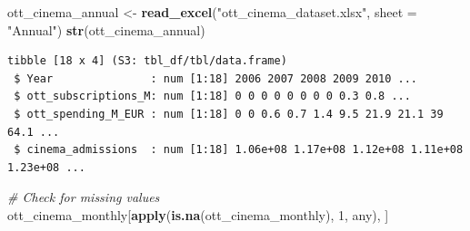 \documentclass[
]{article}
\newenvironment{Shaded}{\begin{snugshade}}{\end{snugshade}}
\newcommand{\AttributeTok}[1]{\textcolor[rgb]{0.13,0.29,0.53}{#1}}
\newcommand{\CommentTok}[1]{\textcolor[rgb]{0.56,0.35,0.01}{\textit{#1}}}
\newcommand{\DecValTok}[1]{\textcolor[rgb]{0.00,0.00,0.81}{#1}}
\newcommand{\FunctionTok}[1]{\textcolor[rgb]{0.13,0.29,0.53}{\textbf{#1}}}
\newcommand{\NormalTok}[1]{#1}
\newcommand{\OtherTok}[1]{\textcolor[rgb]{0.56,0.35,0.01}{#1}}
\newcommand{\StringTok}[1]{\textcolor[rgb]{0.31,0.60,0.02}{#1}}
\begin{document}
\begin{Shaded}
\begin{Highlighting}[]
\NormalTok{ott\_cinema\_annual }\OtherTok{\textless{}{-}} \FunctionTok{read\_excel}\NormalTok{(}\StringTok{"ott\_cinema\_dataset.xlsx"}\NormalTok{, }\AttributeTok{sheet =} \StringTok{"Annual"}\NormalTok{)}
\FunctionTok{str}\NormalTok{(ott\_cinema\_annual)}
\end{Highlighting}
\end{Shaded}

\begin{verbatim}
tibble [18 x 4] (S3: tbl_df/tbl/data.frame)
 $ Year               : num [1:18] 2006 2007 2008 2009 2010 ...
 $ ott_subscriptions_M: num [1:18] 0 0 0 0 0 0 0 0 0.3 0.8 ...
 $ ott_spending_M_EUR : num [1:18] 0 0 0.6 0.7 1.4 9.5 21.9 21.1 39 64.1 ...
 $ cinema_admissions  : num [1:18] 1.06e+08 1.17e+08 1.12e+08 1.11e+08 1.23e+08 ...
\end{verbatim}

\begin{Shaded}
\end{Shaded}

\begin{Shaded}
\begin{Highlighting}[]
\CommentTok{\# Check for missing values}
\NormalTok{ott\_cinema\_monthly[}\FunctionTok{apply}\NormalTok{(}\FunctionTok{is.na}\NormalTok{(ott\_cinema\_monthly), }\DecValTok{1}\NormalTok{, any), ]}
\end{Highlighting}
\end{Shaded}
\end{document}
